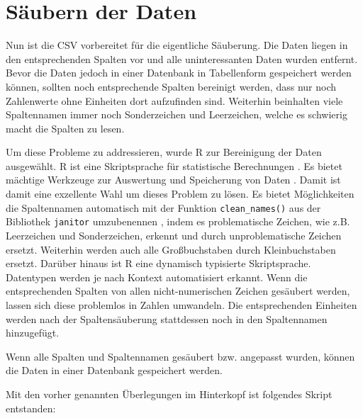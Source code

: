 \chapter{Säubern der Daten}

Nun ist die CSV vorbereitet für die eigentliche Säuberung. Die Daten liegen in den entsprechenden Spalten vor und alle uninteressanten Daten wurden entfernt.
Bevor die Daten jedoch in einer Datenbank in Tabellenform gespeichert werden können, sollten noch entsprechende Spalten bereinigt werden, dass nur noch Zahlenwerte ohne Einheiten dort aufzufinden sind.
Weiterhin beinhalten viele Spaltennamen immer noch Sonderzeichen und Leerzeichen, welche es schwierig macht die Spalten zu lesen.

Um diese Probleme zu addressieren, wurde R zur Bereinigung der Daten ausgewählt.
R ist eine Skriptsprache für statistische Berechnungen \cite{noauthor_r_nodate}. Es bietet mächtige Werkzeuge zur Auswertung und Speicherung von Daten \cite{noauthor_r_nodate}. Damit ist damit eine exzellente Wahl um dieses Problem zu lösen.
Es bietet Möglichkeiten die Spaltennamen automatisch mit der Funktion  \lstinline |clean_names()| aus der Bibliothek \lstinline|janitor| umzubenennen \cite{noauthor_janitor_nodate}, indem es problematische Zeichen, wie z.B. Leerzeichen und Sonderzeichen, erkennt und durch unproblematische Zeichen ersetzt.
Weiterhin werden auch alle Großbuchstaben durch Kleinbuchstaben ersetzt.
Darüber hinaus ist R eine dynamisch typisierte Skriptsprache. Datentypen werden je nach Kontext automatisiert erkannt.
Wenn die entsprechenden Spalten von allen nicht-numerischen Zeichen gesäubert werden, lassen sich diese problemlos in Zahlen umwandeln.
Die entsprechenden Einheiten werden nach der Spaltensäuberung stattdessen noch in den Spaltennamen hinzugefügt.

Wenn alle Spalten und Spaltennamen gesäubert bzw. angepasst wurden, können die Daten in einer Datenbank gespeichert werden.

Mit den vorher genannten Überlegungen im Hinterkopf ist folgendes Skript entstanden: 


\lstset{
	breaklines=true,         %
	breakatwhitespace=false, %
	basicstyle=\ttfamily,    %
}

